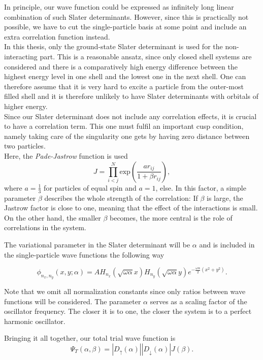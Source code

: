 In principle, our wave function could be expressed as infinitely long linear combination of such Slater determinants. However, since this is practically not possible, we have to cut the single-particle basis at some point and include an extra correlation function instead.\\
In this thesis, only the ground-state Slater determinant is used for the non-interacting part. This is a reasonable ansatz, since only closed shell systems are considered and there is a comparatively high energy difference between the highest energy level in one shell and the lowest one in the next shell. One can therefore assume that it is very hard to excite a particle from the outer-most filled shell and it is therefore unlikely to have Slater determinants with orbitals of higher energy. \\
Since our Slater determinant does not include any correlation effects, it is crucial to have a correlation term. This one must fulfil an important cusp condition, namely taking care of the singularity one gets by having zero distance between two particles.\\
Here, the \textit{Pade-Jastrow} function is used
\[
J = \prod\limits_{i<j}^N \text{exp}\left(\frac{a r_{ij}}{1+\beta r_{ij}}\right),
\]
where $a=\frac{1}{3}$ for particles of equal spin and $a=1$, else. In this factor, a simple parameter $\beta$ describes the whole strength of the correlation: If $\beta$ is large, the Jastrow factor is close to one, meaning that the effect of the interactions is small. On the other hand, the smaller $\beta$ becomes, the more central is the role of correlations in the system.

The variational parameter in the Slater determinant will be $\alpha$ and is included in the single-particle wave functions the following way

\[
\phi_{n_x,n_y}\left(x,y;\alpha \right) = A H_{n_x}\left(\sqrt{\omega\alpha}x\right) H_{n_y}\left(\sqrt{\omega\alpha}y\right) e^{-\frac{\omega\alpha}{2}\left(x^2+y^2\right)}.
\]

Note that we omit all normalization constants since only ratios between wave functions will be considered. The parameter $\alpha$ serves as a scaling factor of the oscillator frequency. The closer it is to one, the closer the system is to a perfect harmonic oscillator.

Bringing it all together, our total trial wave function is
\begin{equation}
\Psi_T(\alpha, \beta ) = \left| D_{\uparrow}(\alpha)\right| \left| D_{\downarrow}(\alpha)\right| J(\beta).
\label{eq:VMCWF}
\end{equation}

